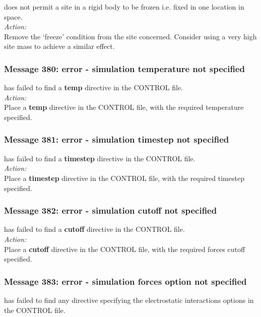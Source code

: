 \D{} does not permit a site in a rigid body  to be frozen i.e.
fixed in one location in space. \\

\noindent
{\em Action:} \\
Remove the `freeze' condition from the site concerned. Consider using
a very high site mass to achieve a similar effect.

\subsubsection*{Message 380: error - simulation temperature not specified}

\D{} has failed to find a {\bf temp} directive in the CONTROL file.\\

\noindent
{\em Action:} \\ 
Place a {\bf temp} directive in the CONTROL file, with the required
temperature specified.

\subsubsection*{Message 381: error - simulation timestep not specified}

\D{} has failed to find a {\bf timestep} directive in the CONTROL file.\\

\noindent
{\em Action:} \\ 
Place a {\bf timestep} directive in the CONTROL file, with the required
timestep specified.

\subsubsection*{Message 382: error - simulation cutoff not specified}

\D{} has failed to find a {\bf cutoff} directive in the CONTROL file.\\

\noindent
{\em Action:} \\ 
Place a {\bf cutoff} directive in the CONTROL file, with the required
forces cutoff specified.

\subsubsection*{Message 383: error - simulation forces option not specified}

\D{} has failed to find any directive specifying the electrostatic interactions
options in the CONTROL file.\\


